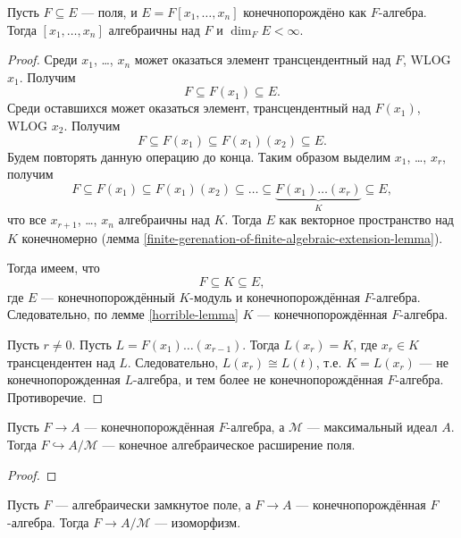 \documentclass[12pt,a4paper]{article}
\begin{document}
    \begin{lemma}
        Пусть $F \subseteq E$ --- поля, и $E = F[x_1, \dots, x_n]$ конечнопорождёно как $F$-алгебра. Тогда $[x_1, \dots, x_n]$ алгебраичны над $F$ и $\dim_F E < \infty$.
    \end{lemma}

    \begin{proof}
        Среди $x_1$, \dots, $x_n$ может оказаться элемент трансцендентный над $F$, WLOG $x_1$. Получим
        \[F \subseteq F(x_1) \subseteq E.\]
        Среди оставшихся может оказаться элемент, трансцендентный над $F(x_1)$, WLOG $x_2$. Получим
        \[F \subseteq F(x_1) \subseteq F(x_1)(x_2) \subseteq E.\]
        Будем повторять данную операцию до конца. Таким образом выделим $x_1$, \dots, $x_r$, получим
        \[F \subseteq F(x_1) \subseteq F(x_1)(x_2) \subseteq \dots \subseteq \underbrace{F(x_1)\dots(x_r)}_{K} \subseteq E,\]
        что все $x_{r+1}$, \dots, $x_n$ алгебраичны над $K$. Тогда $E$ как векторное пространство над $K$ конечномерно (лемма \ref{finite-gerenation-of-finite-algebraic-extension-lemma}).
        
        Тогда имеем, что
        \[F \subseteq K \subseteq E,\]
        где $E$ --- конечнопорождённый $K$-модуль и конечнопорождённая $F$-алгебра. Следовательно, по лемме \ref{horrible-lemma} $K$ --- конечнопорождённая $F$-алгебра.

        Пусть $r \neq 0$. Пусть $L = F(x_1)\dots(x_{r-1})$. Тогда $L(x_r) = K$, где $x_r \in K$ трансцендентен над $L$. Следовательно, $L(x_r) \cong L(t)$, т.е. $K = L(x_r)$ --- не конечнопорожденная $L$-алгебра, и тем более не конечнопорождённая $F$-алгебра. Противоречие.
    \end{proof}

    \begin{corollary}
        Пусть $F \to A$ --- конечнопорождённая $F$-алгебра, а $\mathcal{M}$ --- максимальный идеал $A$. Тогда $F \hookrightarrow A/\mathcal{M}$ --- конечное алгебраическое расширение поля.
    \end{corollary}

    \begin{proof}
    \end{proof}

    \begin{corollary}
        Пусть $F$ --- алгебраически замкнутое поле, а $F \to A$ --- конечнопорождённая $F$-алгебра. Тогда $F \to A/\mathcal{M}$ --- изоморфизм.
    \end{corollary}
\end{document}
